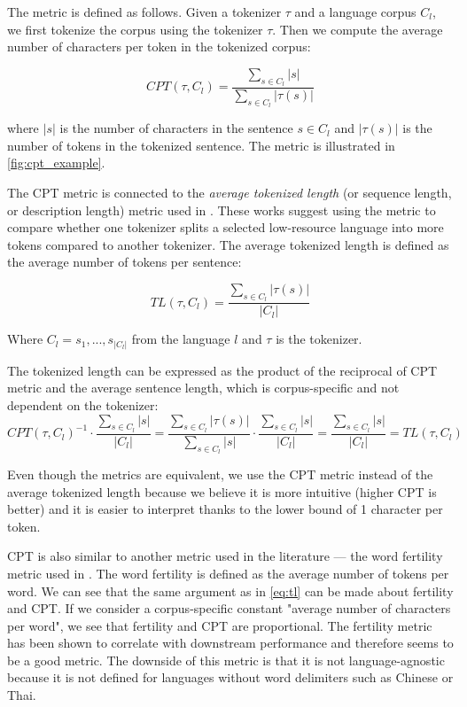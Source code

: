 The metric is defined as follows. Given a tokenizer $\tau$ and a language corpus $C_l$, we first tokenize the corpus using the tokenizer $\tau$. Then we compute the average number of characters per token in the tokenized corpus:

\begin{equation}
    CPT(\tau, C_l) = \frac{\sum_{s \in C_l}|s|}{\sum_{s \in C_l}|\tau(s)|}
\end{equation}

where $|s|$ is the number of characters in the sentence $s \in C_l$ and $|\tau(s)|$ is the number of tokens in the tokenized sentence. The metric is illustrated in \autoref{fig:cpt_example}.

The CPT metric is connected to the \textit{average tokenized length} (or sequence length, or description length) metric used in \citet{chung_improving_2020,liang_xlm-v_2023}. 
These works suggest using the metric to compare whether one tokenizer splits a selected low-resource language into more tokens compared to another tokenizer. The average tokenized length is defined as the average number of tokens per sentence: 

\begin{equation}
\label{eq:tl_def}
    TL(\tau, C_l) = \frac{\sum_{s \in C_l}|\tau(s)|}{|C_l|}
\end{equation}

Where $C_l = {s_1, ..., s_{|C_l|}}$ from the language $l$ and $\tau$ is the tokenizer.

The tokenized length can be expressed as the product of the reciprocal of CPT metric and the average sentence length, which is corpus-specific and not dependent on the tokenizer:
\begin{equation}
\label{eq:tl}
    CPT(\tau, C_l)^{-1} \cdot \frac{\sum_{s \in C_l}|s|}{|C_l|} = \frac{\sum_{s \in C_l}|\tau(s)|}{\sum_{s \in C_l}|s|} \cdot \frac{\sum_{s \in C_l}|s|}{|C_l|} = \frac{\sum_{s \in C_l}|s|}{|C_l|} = TL(\tau, C_l)
\end{equation}

Even though the metrics are equivalent, we use the CPT metric instead of the average tokenized length because we believe it is more intuitive (higher CPT is better) and it is easier to interpret thanks to the lower bound of 1 character per token.

CPT is also similar to another metric used in the literature --- the word fertility metric used in \citet{rust_how_2021}. The word fertility is defined as the average number of tokens per word. We can see that the same argument as in \autoref{eq:tl} can be made about fertility and CPT. If we consider a corpus-specific constant "average number of characters per word", we see that fertility and CPT are proportional. The fertility metric has been shown to correlate with downstream performance and therefore seems to be a good metric. The downside of this metric is that it is not language-agnostic because it is not defined for languages without word delimiters such as Chinese or Thai.

